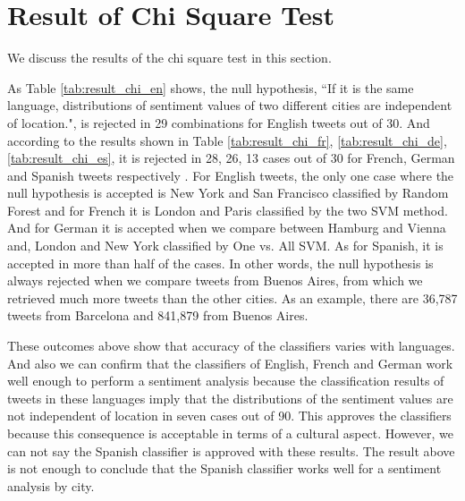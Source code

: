 
\section{Result of Chi Square Test}
We discuss the results of the chi square test in this section.

As Table \ref{tab:result_chi_en} shows, the null hypothesis, ``If it is the same language, distributions of sentiment values of two different cities are independent of location.", is rejected in 29 combinations for English tweets out of 30.
And according to the results shown in Table \ref{tab:result_chi_fr}, \ref{tab:result_chi_de}, \ref{tab:result_chi_es}, it is rejected in 28, 26, 13 cases out of 30 for French, German and Spanish tweets respectively . 
For English tweets, the only one case where the null hypothesis is accepted is New York and San Francisco classified by Random Forest and for French it is London and Paris classified by the two SVM method.
And for German it is accepted when we compare between Hamburg and Vienna and, London and New York classified by One vs. All SVM.
As for Spanish, it is accepted in more than half of the cases.
In other words, the null hypothesis is always rejected when we compare tweets from Buenos Aires, from which we retrieved much more tweets than the other cities.
As an example, there are 36,787 tweets from Barcelona and 841,879 from Buenos Aires.

These outcomes above show that accuracy of the classifiers varies with languages. 
And also we can confirm that the classifiers of English, French and German work well enough to perform a sentiment analysis because the classification results of tweets in these languages imply that the distributions of the sentiment values are not independent of location in seven cases out of 90.
This approves the classifiers because this consequence is acceptable in terms of a cultural aspect.
However, we can not say the Spanish classifier is approved with these results.
The result above is not enough to conclude that the Spanish classifier works well for a sentiment analysis by city.

